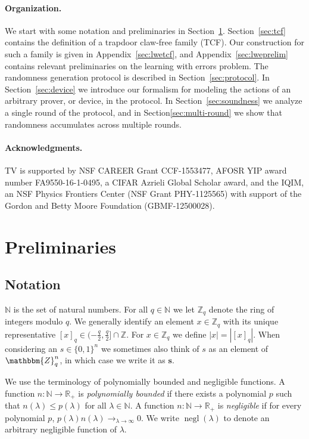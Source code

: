 \documentclass[11pt]{article}
\theoremstyle{remark}
\theoremstyle{definition}
\newcommand{\N}{\ensuremath{\mathbb{N}}}
\newcommand{\bbN}{\ensuremath{\mathbb{N}}}
\newcommand{\R}{\ensuremath{\mathbb{R}}}
\DeclareMathOperator{\negl}{negl}
\newcommand{\mZ}{\mathbbm{Z}}
\newcommand{\trnq}[1]{\left[ {#1} \right]_q}
\newcommand{\bbZ}{\mathbb{Z}}
\newcommand{\abs}[1]{\left\vert {#1} \right\vert}
\def\*#1{\mathbf{#1}}
\begin{document}
\paragraph{Organization.} We start with some notation and preliminaries in Section~\ref{sec:prelim}. Section~\ref{sec:tcf} contains the definition of a trapdoor claw-free family (TCF). Our construction for such a family is given in Appendix~\ref{sec:lwetcf}, and Appendix~\ref{sec:lweprelim} contains relevant preliminaries on the learning with errors problem. The randomness generation protocol is described in Section~\ref{sec:protocol}. In Section~\ref{sec:device} we introduce our formalism for modeling the actions of an arbitrary prover, or device, in the protocol. In Section~\ref{sec:soundness} we analyze a single round of the protocol, and in Section\ref{sec:multi-round} we show that randomness accumulates across multiple rounds. 



\paragraph{Acknowledgments.}
TV is supported by NSF CAREER Grant CCF-1553477, AFOSR YIP award number FA9550-16-1-0495, a CIFAR Azrieli Global Scholar award, and the IQIM, an NSF Physics Frontiers Center (NSF Grant PHY-1125565) with support of the Gordon and Betty Moore Foundation (GBMF-12500028).

\section{Preliminaries}
\label{sec:prelim}

\subsection{Notation}

$\N$ is the set of natural numbers. 
For all $q \in \bbN$ we let $\bbZ_q$ denote the ring of integers modulo $q$. We generally identify an element $x\in\bbZ_q$ with its unique representative $\trnq{x}\in (-\tfrac{q}{2}, \tfrac{q}{2}] \cap \bbZ$. For $x\in\bbZ_q$ we define $\abs{x}=|{\trnq{x}}|$.
When considering an $s\in \{0,1\}^n$ we sometimes also think of $s$ as an element of $\mZ_q^n$, in which case we write it as $\*s$. 

We use the terminology of polynomially bounded and negligible functions. A function $n: \N \to \R_+$ is \emph{polynomially bounded} if there exists a polynomial $p$ such that $n(\lambda)\leq p(\lambda)$ for all $\lambda \in \N$. A function $n: \N \to \R_+$ is \emph{negligible} if for every polynomial $p$, $p(\lambda) n(\lambda)\to_{\lambda\to\infty} 0$. We write $\negl(\lambda)$ to denote an arbitrary negligible function of $\lambda$. 
\end{document}
